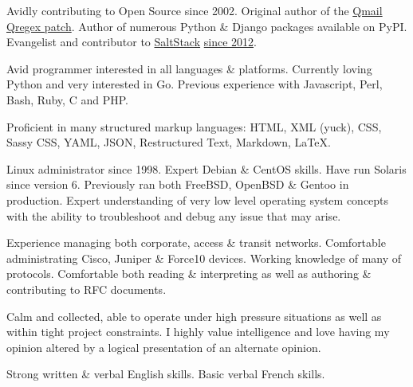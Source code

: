 \documentclass{eab-cv}
\begin{document}



\stoptimeline


Avidly contributing to Open Source since 2002.  Original author of the
\href{http://borgstrom.ca/qregex.patch-20020129.txt}{Qmail Qregex patch}.  Author of numerous Python \& Django packages
available on PyPI.  Evangelist and contributor to \href{http://saltstack.org/}{SaltStack}
\href{https://github.com/saltstack/salt/commit/744fc0bd32d6f527c1f9e12cdca5bc7ab68f351e}{since 2012}.

Avid programmer interested in all languages \& platforms.  Currently loving Python and very interested in Go.  Previous
experience with Javascript, Perl, Bash, Ruby, C and PHP.

Proficient in many structured markup languages: HTML, XML (yuck), CSS, Sassy CSS, YAML, JSON, Restructured Text,
Markdown, \LaTeX.

Linux administrator since 1998.  Expert Debian \& CentOS skills.  Have run Solaris since version 6.  Previously ran both
FreeBSD, OpenBSD \& Gentoo in production.  Expert understanding of very low level operating system concepts with the
ability to troubleshoot and debug any issue that may arise.

Experience managing both corporate, access \& transit networks.  Comfortable administrating Cisco, Juniper \& Force10
devices.  Working knowledge of many of protocols.  Comfortable both reading \& interpreting as well as authoring \&
contributing to RFC documents.

Calm and collected, able to operate under high pressure situations as well as within tight project constraints.  I
highly value intelligence and love having my opinion altered by a logical presentation of an alternate opinion.

 Strong written \& verbal English skills.  Basic verbal French skills.
\end{document}
